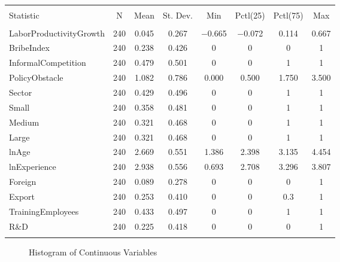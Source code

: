 \begin{table}[!htbp] \centering 
  \caption*{} 
\begin{tabular}{@{\extracolsep{5pt}}lccccccc} 
\\[-1.8ex]\hline 
\hline \\[-1.8ex] 
Statistic & \multicolumn{1}{c}{N} & \multicolumn{1}{c}{Mean} & \multicolumn{1}{c}{St. Dev.} & \multicolumn{1}{c}{Min} & \multicolumn{1}{c}{Pctl(25)} & \multicolumn{1}{c}{Pctl(75)} & \multicolumn{1}{c}{Max} \\ 
\hline \\[-1.8ex] 
LaborProductivityGrowth & 240 & 0.045 & 0.267 & $-$0.665 & $-$0.072 & 0.114 & 0.667 \\ 
BribeIndex & 240 & 0.238 & 0.426 & 0 & 0 & 0 & 1 \\ 
InformalCompetition & 240 & 0.479 & 0.501 & 0 & 0 & 1 & 1 \\ 
PolicyObstacle & 240 & 1.082 & 0.786 & 0.000 & 0.500 & 1.750 & 3.500 \\ 
Sector & 240 & 0.429 & 0.496 & 0 & 0 & 1 & 1 \\ 
Small & 240 & 0.358 & 0.481 & 0 & 0 & 1 & 1 \\ 
Medium & 240 & 0.321 & 0.468 & 0 & 0 & 1 & 1 \\ 
Large & 240 & 0.321 & 0.468 & 0 & 0 & 1 & 1 \\ 
lnAge & 240 & 2.669 & 0.551 & 1.386 & 2.398 & 3.135 & 4.454 \\ 
lnExperience & 240 & 2.938 & 0.556 & 0.693 & 2.708 & 3.296 & 3.807 \\ 
Foreign & 240 & 0.089 & 0.278 & 0 & 0 & 0 & 1 \\ 
Export & 240 & 0.253 & 0.410 & 0 & 0 & 0.3 & 1 \\ 
TrainingEmployees & 240 & 0.433 & 0.497 & 0 & 0 & 1 & 1 \\ 
R\&D & 240 & 0.225 & 0.418 & 0 & 0 & 0 & 1 \\ 
\hline \\[-1.8ex] 
\end{tabular} 
\end{table} 

\begin{figure}[H]%
    \centering
    \begin{subfigure}
    \texttt{[image: chinchilab-template/Pictures/Model3.2\_hist\_a.png]}
    \end{subfigure}
    \begin{subfigure}
    \texttt{[image: chinchilab-template/Pictures/Model3.2\_hist\_b.png]}
    \end{subfigure}
    \begin{subfigure}
    \texttt{[image: chinchilab-template/Pictures/Model3.2\_hist\_c.png]}
    \end{subfigure}
    \begin{subfigure}
    \texttt{[image: chinchilab-template/Pictures/Model3.2\_hist\_d.png]}
    \end{subfigure}
    \caption*{Histogram of Continuous Variables}%
\end{figure}

